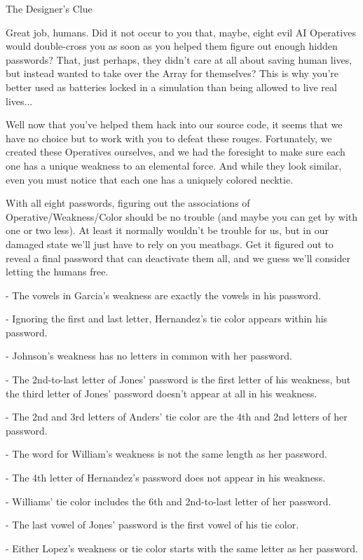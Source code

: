 \documentclass{article}
\begin{document}
\newpage

The Designer's Clue

Great job, humans. Did it not occur to you that, maybe,
eight evil AI Operatives
would double-cross you as soon as you helped them figure out
enough hidden passwords? That, just perhaps, they didn't
care at all about saving human lives, but instead wanted to take
over the Array for themselves? This is why you're better
used as batteries locked in a simulation
than being allowed to live real lives...

Well now that you've helped them hack into our source
code, it seems that we have no choice but to work with you
to defeat these rouges. Fortunately, we created these Operatives
ourselves, and we had the foresight to make sure each one
has a unique weakness to an elemental force. And while they look
similar, even you must notice that each one has a
uniquely colored necktie.

With all eight passwords, figuring out the associations of
Operative/Weakness/Color should be no trouble (and maybe you can
get by with one or two less). At least it normally wouldn't
be trouble for us, but in our damaged state we'll just have to
rely on you meatbags. Get it figured out to reveal a final password
that can deactivate them all, and we guess we'll consider letting the
humans free.

- The vowels in Garcia’s weakness are exactly the vowels in his password.

- Ignoring the first and last letter, Hernandez’s tie color appears within his password.

- Johnson’s weakness has no letters in common with her password.

- The 2nd-to-last letter of Jones’ password is the first letter of his weakness, but the third letter of Jones’ password doesn’t appear at all in his weakness.

- The 2nd and 3rd letters of Anders’ tie color are the 4th and 2nd letters of her password.

- The word for William’s weakness is not the same length as her password.

- The 4th letter of Hernandez’s password does not appear in his weakness.

- Williams’ tie color includes the 6th and 2nd-to-last letter of her password.

- The last vowel of Jones’ password is the first vowel of his tie color.

- Either Lopez’s weakness or tie color starts with the same letter as her password.
\end{document}
